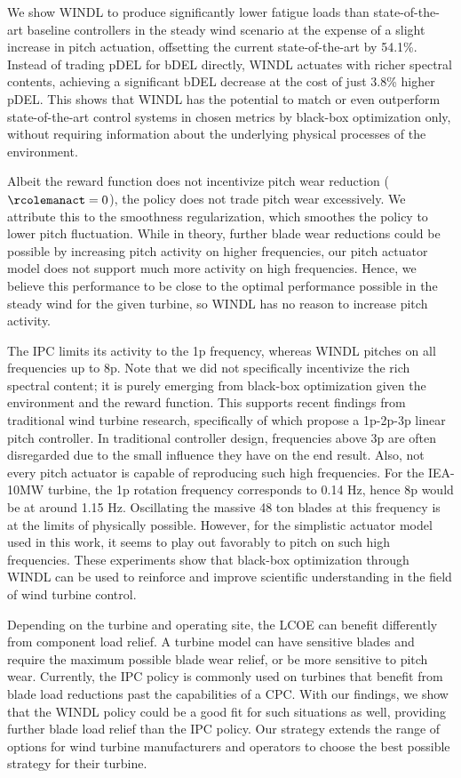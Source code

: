 We show WINDL to produce significantly lower fatigue loads than state-of-the-art baseline controllers in the steady wind scenario at the expense of a slight increase in pitch actuation, offsetting the current state-of-the-art by 54.1\%. Instead of trading pDEL for bDEL directly, WINDL actuates with richer spectral contents, achieving a significant bDEL decrease at the cost of just 3.8\% higher pDEL. This shows that WINDL has the potential to match or even outperform state-of-the-art control systems in chosen metrics by black-box optimization only, without requiring information about the underlying physical processes of the environment. 

Albeit the reward function does not incentivize pitch wear reduction ($\rcolemanact=0$), the policy does not trade pitch wear excessively. We attribute this to the smoothness regularization, which smoothes the policy to lower pitch fluctuation. While in theory, further blade wear reductions could be possible by increasing pitch activity on higher frequencies, our pitch actuator model does not support much more activity on high frequencies. Hence, we believe this performance to be close to the optimal performance possible in the steady wind for the given turbine, so WINDL has no reason to increase pitch activity.

The IPC limits its activity to the 1p frequency, whereas WINDL pitches on all frequencies up to 8p. Note that we did not specifically incentivize the rich spectral content; it is purely emerging from black-box optimization given the environment and the reward function. This supports recent findings from traditional wind turbine research, specifically of \citet{vansolingenLinearIndividualPitch2015} which propose a 1p-2p-3p linear pitch controller. In traditional controller design, frequencies above 3p are often disregarded due to the small influence they have on the end result. Also, not every pitch actuator is capable of reproducing such high frequencies. For the IEA-10MW turbine, the 1p rotation frequency corresponds to 0.14 Hz, hence 8p would be at around 1.15 Hz. Oscillating the massive 48 ton blades at this frequency is at the limits of physically possible. However, for the simplistic actuator model used in this work, it seems to play out favorably to pitch on such high frequencies. These experiments show that black-box optimization through WINDL can be used to reinforce and improve scientific understanding in the field of wind turbine control.

Depending on the turbine and operating site, the \ac{LCOE} can benefit differently from component load relief. A turbine model can have sensitive blades and require the maximum possible blade wear relief, or be more sensitive to pitch wear. Currently, the IPC policy is commonly used on turbines that benefit from blade load reductions past the capabilities of a CPC. With our findings, we show that the \ac{WINDL} policy could be a good fit for such situations as well, providing further blade load relief than the IPC policy. Our strategy extends the range of options for wind turbine manufacturers and operators to choose the best possible strategy for their turbine.

